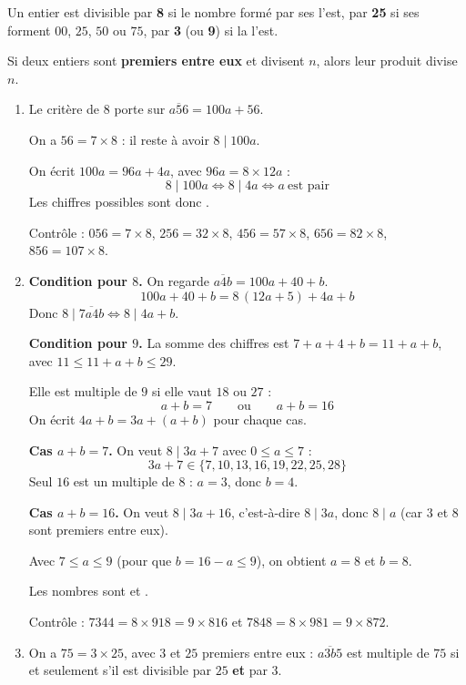 \begin{prop}
Un entier est divisible par \textbf{8} si le nombre formé par ses  l'est, par \textbf{25} si ses  forment $00$, $25$, $50$ ou $75$, par \textbf{3} (ou \textbf{9}) si la  l'est.

Si deux entiers sont \textbf{premiers entre eux} et divisent $n$, alors leur produit divise $n$.
\end{prop}
\begin{enumerate}
  \item Le critère de $8$ porte sur $\overline{a56}=100a+56$.

  On a $56=7\times8$ : il reste à avoir $8\mid100a$.

  On écrit $100a=96a+4a$, avec $96a=8\times12a$ :
  \[8\mid100a\iff8\mid4a\iff a\ \text{est pair}\]
  Les chiffres possibles sont donc .

  Contrôle : $056=7\times8$, $256=32\times8$, $456=57\times8$, $656=82\times8$, $856=107\times8$.

  \item \textbf{Condition pour $8$.} On regarde $\overline{a4b}=100a+40+b$.
  \[100a+40+b=8\,(12a+5)+4a+b\]
  Donc $8\mid\overline{7a4b}\iff8\mid4a+b$.

  \textbf{Condition pour $9$.} La somme des chiffres est $7+a+4+b=11+a+b$, avec $11\leq11+a+b\leq29$.

  Elle est multiple de $9$ si elle vaut $18$ ou $27$ :
  \[a+b=7\qquad\text{ou}\qquad a+b=16\]
  On écrit $4a+b=3a+(a+b)$ pour chaque cas.

  \textbf{Cas $a+b=7$.} On veut $8\mid3a+7$ avec $0\leq a\leq7$ :
  \[3a+7\in\{7,10,13,16,19,22,25,28\}\]
  Seul $16$ est un multiple de $8$ : $a=3$, donc $b=4$.

  \textbf{Cas $a+b=16$.} On veut $8\mid3a+16$, c'est-à-dire $8\mid3a$, donc $8\mid a$ (car $3$ et $8$ sont premiers entre eux).

  Avec $7\leq a\leq9$ (pour que $b=16-a\leq9$), on obtient $a=8$ et $b=8$.

  Les nombres sont  et .

  Contrôle : $7344=8\times918=9\times816$ et $7848=8\times981=9\times872$.

  \item On a $75=3\times25$, avec $3$ et $25$ premiers entre eux : $\overline{a3b5}$ est multiple de $75$ si et seulement s'il est divisible par $25$ \textbf{et} par $3$.


\end{enumerate}
